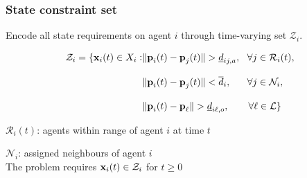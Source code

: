 \begin{frame} %
  \frametitle{State constraint set}

  Encode all state requirements on agent $i$ through time-varying set $\mathcal{Z}_i$.

  \begin{align}
    \mathcal{Z}_i = \{ \vect{x}_i(t) \in X_i :
        &\|\vect{p}_i(t) - \vect{p}_{j}(t)\| > \underline{d}_{ij,a},\ \ \forall j \in \mathcal{R}_i(t), \\[2ex]
        &\|\vect{p}_i(t) - \vect{p}_{j}(t)\| < \overline{d}_{i},\ \ \ \ \ \forall j \in \mathcal{N}_i, \\[2ex]
        &\|\vect{p}_i(t) - \vect{p}_\ell\| > \underline{d}_{i\ell,o},\ \ \ \ \ \ \forall \ell \in \mathcal{L} \}
  \end{align}

  $\mathcal{R}_i(t)$: agents within range of agent $i$ at time $t$

  $\mathcal{N}_i$: assigned neighbours of agent $i$\\[4ex]

  The problem requires $\bm{\mathbf{x}}_i(t) \in \mathcal{Z}_i$ for $t \geq 0$

\end{frame} %
